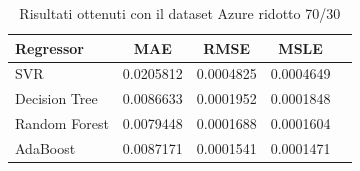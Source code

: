 \begin{table}[H]
    \centering
    \begin{tabular}{|>{\centering\arraybackslash}m{5cm}|c|c|c|c|}
        \hline
        \textbf{Regressor} & \textbf{MAE} & \textbf{RMSE} & \textbf{MSLE} \\ [10pt]
        \hline
        SVR & 0.0205812 & 0.0004825 & 0.0004649 \\ [10pt]
        \hline
        Decision Tree & 0.0086633 & 0.0001952 & 0.0001848 \\ [10pt]
        \hline
        Random Forest & 0.0079448 & 0.0001688 & 0.0001604 \\ [10pt]
        \hline
        AdaBoost & 0.0087171 & 0.0001541 & 0.0001471 \\ [10pt]
        \hline
    \end{tabular}
    \caption{Risultati ottenuti con il dataset Azure ridotto 70/30}
    \label{tab:results}
\end{table}

